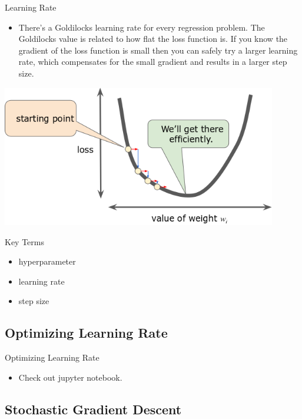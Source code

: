 \documentclass{beamer}
\begin{document}
\begin{frame}{Learning Rate}
\begin{itemize}
    \item There's a Goldilocks learning rate for every regression problem. The Goldilocks value is related to how flat the loss function is. If you know the gradient of the loss function is small then you can safely try a larger learning rate, which compensates for the small gradient and results in a larger step size.
\end{itemize}
\includegraphics[width=0.9\textwidth]{images/LearningRateJustRight.png}
\end{frame}

\begin{frame}{Key Terms}
\begin{itemize}
    \item hyperparameter
    \item learning rate
    \item step size
\end{itemize}
\end{frame}

\subsection{Optimizing Learning Rate}

\begin{frame}{Optimizing Learning Rate}
\begin{itemize}
    \item Check out jupyter notebook.
\end{itemize}
\end{frame}

\subsection{Stochastic Gradient Descent}
\end{document}
